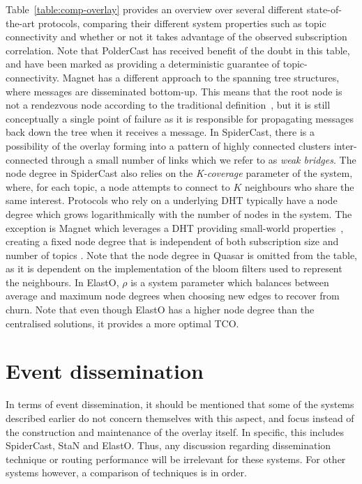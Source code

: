 

Table~\ref{table:comp-overlay} provides an overview over several
different state-of-the-art protocols, comparing their different system
properties such as topic connectivity and whether or not it takes
advantage of the observed subscription correlation.  Note that
PolderCast has received benefit of the doubt in this table, and have
been marked as providing a deterministic guarantee of
topic-connectivity. Magnet has a different approach to the spanning tree
structures, where messages are disseminated bottom-up. This means that
the root node is not a rendezvous node according to  the traditional
definition~\cite{baldoni2005distributed}, but it is still conceptually
a single point of failure as it is responsible for propagating messages
back down the tree when it receives a message. In SpiderCast, there is a possibility
of the overlay forming into a pattern of highly connected clusters
inter-connected through a small number of links which we refer to as
\emph{weak bridges}. The node degree in SpiderCast also relies on the
\emph{K-coverage} parameter of the system, where, for each topic, a node
attempts to connect to $K$ neighbours who share the same interest.
Protocols who rely on a underlying DHT typically have a node degree
which grows logarithmically with the number of nodes in the system. The
exception is Magnet which leverages a DHT providing small-world
properties~\cite{girdzijauskas2007oscar}, creating a fixed node degree
that is independent of both subscription size and number of topics
\cite{Zhuang:2001}.  Note that the node degree in Quasar is omitted from
the table, as it is dependent on the implementation of the bloom filters
used to represent the neighbours. In ElastO, $\rho$ is a system parameter
which balances between average and maximum node degrees when choosing
new edges to recover from churn. Note that even though ElastO has a
higher node degree than the centralised solutions, it provides a more
optimal TCO.\

\section{Event dissemination}

In terms of event dissemination, it should be mentioned that some of
the systems described earlier do not concern themselves with this aspect, and
focus instead of the construction and maintenance of the overlay
itself. In specific, this includes SpiderCast, StaN and ElastO. Thus, any
discussion regarding dissemination technique or routing performance
will be irrelevant for these systems. For other systems however, a
comparison of techniques is in order.

